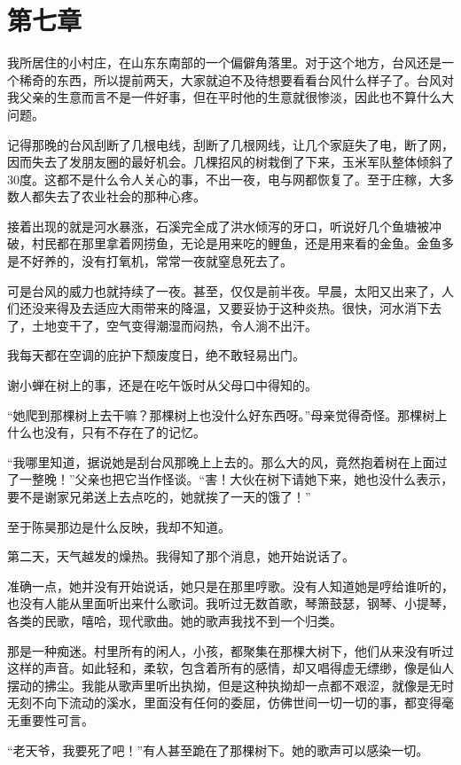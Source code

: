 \documentclass[lang=cn]{elegantpaper}
\begin{document}
\section{第七章}
\label{sec:orgeb0ba04}

我所居住的小村庄，在山东东南部的一个偏僻角落里。对于这个地方，台风还是一个稀奇的东西，所以提前两天，大家就迫不及待想要看看台风什么样子了。台风对我父亲的生意而言不是一件好事，但在平时他的生意就很惨淡，因此也不算什么大问题。

记得那晚的台风刮断了几根电线，刮断了几根网线，让几个家庭失了电，断了网，因而失去了发朋友圈的最好机会。几棵招风的树栽倒了下来，玉米军队整体倾斜了30度。这都不是什么令人关心的事，不出一夜，电与网都恢复了。至于庄稼，大多数人都失去了农业社会的那种心疼。

接着出现的就是河水暴涨，石溪完全成了洪水倾泻的牙口，听说好几个鱼塘被冲破，村民都在那里拿着网捞鱼，无论是用来吃的鲤鱼，还是用来看的金鱼。金鱼多是不好养的，没有打氧机，常常一夜就窒息死去了。

可是台风的威力也就持续了一夜。甚至，仅仅是前半夜。早晨，太阳又出来了，人们还没来得及去适应大雨带来的降温，又要妥协于这种炎热。很快，河水消下去了，土地变干了，空气变得潮湿而闷热，令人淌不出汗。

我每天都在空调的庇护下颓废度日，绝不敢轻易出门。

谢小蝉在树上的事，还是在吃午饭时从父母口中得知的。

“她爬到那棵树上去干嘛？那棵树上也没什么好东西呀。”母亲觉得奇怪。那棵树上什么也没有，只有不存在了的记忆。

“我哪里知道，据说她是刮台风那晚上上去的。那么大的风，竟然抱着树在上面过了一整晚！”父亲也把它当作怪谈。“害！大伙在树下请她下来，她也没什么表示，要不是谢家兄弟送上去点吃的，她就挨了一天的饿了！”

至于陈昊那边是什么反映，我却不知道。

第二天，天气越发的燥热。我得知了那个消息，她开始说话了。

准确一点，她并没有开始说话，她只是在那里哼歌。没有人知道她是哼给谁听的，也没有人能从里面听出来什么歌词。我听过无数首歌，琴箫鼓瑟，钢琴、小提琴，各类的民歌，嘻哈，现代歌曲。她的歌声我找不到一个归类。

那是一种痴迷。村里所有的闲人，小孩，都聚集在那棵大树下，他们从来没有听过这样的声音。如此轻和，柔软，包含着所有的感情，却又唱得虚无缥缈，像是仙人摆动的拂尘。我能从歌声里听出执拗，但是这种执拗却一点都不艰涩，就像是无时无刻不向下流动的溪水，里面没有任何的委屈，仿佛世间一切一切的事，都变得毫无重要性可言。

“老天爷，我要死了吧！”有人甚至跪在了那棵树下。她的歌声可以感染一切。
\end{document}
